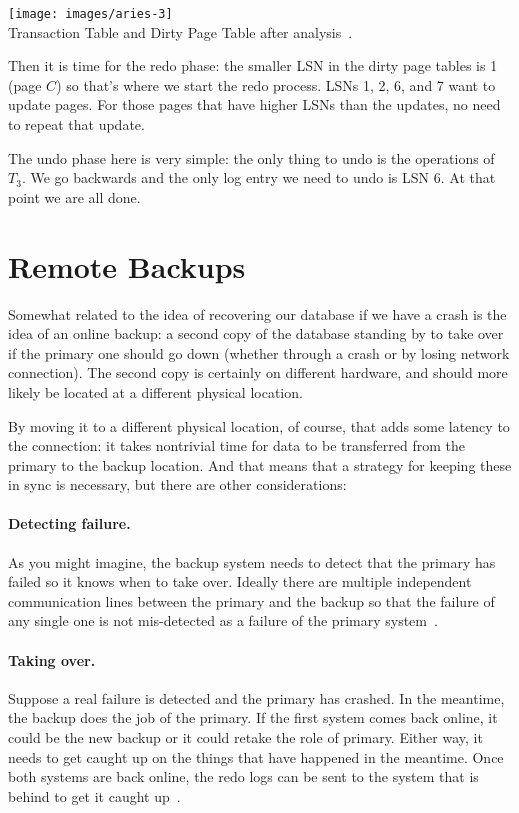 \documentclass[a4paper]{report}
\begin{document}
\begin{center}
\texttt{[image: images/aries-3]}\\
Transaction Table and Dirty Page Table after analysis~\cite{fds}.
\end{center}

Then it is time for the redo phase: the smaller LSN in the dirty page tables is 1 (page $C$) so that's where we start the redo process. LSNs 1, 2, 6, and 7 want to update pages. For those pages that have higher LSNs than the updates, no need to repeat that update.

The undo phase here is very simple: the only thing to undo is the operations of $T_{3}$. We go backwards and the only log entry we need to undo is LSN 6. At that point we are all done.


\section*{Remote Backups}

Somewhat related to the idea of recovering our database if we have a crash is the idea of an online backup: a second copy of the database standing by to take over if the primary one should go down (whether through a crash or by losing network connection). The second copy is certainly on different hardware, and should more likely be located at a different physical location. 

By moving it to a different physical location, of course, that adds some latency to the connection: it takes nontrivial time for data to be transferred from the primary to the backup location. And that means that a strategy for keeping these in sync is necessary, but there are other considerations:

\paragraph{Detecting failure.} As you might imagine, the backup system needs to detect that the primary has failed so it knows when to take over. Ideally there are multiple independent communication lines between the primary and the backup so that the failure of any single one is not mis-detected as a failure of the primary system~\cite{dsc}.

\paragraph{Taking over.} Suppose a real failure is detected and the primary has crashed. In the meantime, the backup does the job of the primary. If the first system comes back online, it could be the new backup or it could retake the role of primary. Either way, it needs to get caught up on the things that have happened in the meantime. Once both systems are back online, the redo logs can be sent to the system that is behind to get it caught up~\cite{dsc}.
\end{document}
